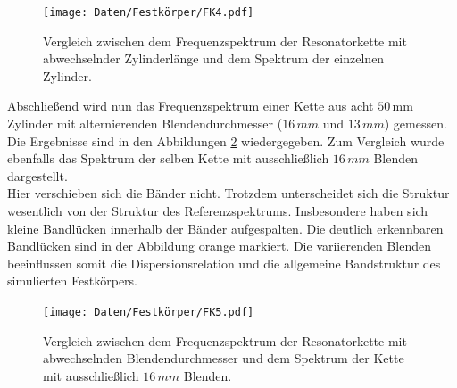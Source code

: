 \begin{figure}[H]
  \centering
  \texttt{[image: Daten/Festkörper/FK4.pdf]} 
  \caption{Vergleich zwischen dem Frequenzspektrum der Resonatorkette mit abwechselnder Zylinderlänge und dem Spektrum der einzelnen Zylinder.} 
  \label{fig:fkMod2}
\end{figure}
Abschließend wird nun das Frequenzspektrum einer Kette aus acht $50\,\si{\milli\metre}$ Zylinder mit alternierenden Blendendurchmesser ($16\, mm$ und $13\, mm$) gemessen. Die Ergebnisse sind in den Abbildungen \ref{fig:fkMod3} wiedergegeben. Zum Vergleich wurde ebenfalls das Spektrum der selben Kette mit ausschließlich $16\, mm$ Blenden dargestellt. \\
Hier verschieben sich die Bänder nicht. Trotzdem unterscheidet sich die Struktur wesentlich von der Struktur des Referenzspektrums. Insbesondere haben sich kleine Bandlücken innerhalb der Bänder aufgespalten. Die deutlich erkennbaren Bandlücken sind in der Abbildung orange markiert. 
Die variierenden Blenden beeinflussen somit die Dispersionsrelation und die allgemeine Bandstruktur des simulierten Festkörpers. 

\begin{figure}[H]
  \centering
  \texttt{[image: Daten/Festkörper/FK5.pdf]} 
  \caption{Vergleich zwischen dem Frequenzspektrum der Resonatorkette mit abwechselnden Blendendurchmesser und dem Spektrum der Kette mit ausschließlich $16\, mm$ Blenden.} 
  \label{fig:fkMod3}
\end{figure}